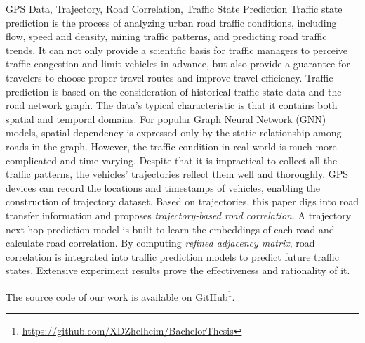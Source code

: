 
\begin{英文摘要}{GPS Data, Trajectory, Road Correlation, Traffic State Prediction}
  Traffic state prediction is the process of analyzing urban road traffic conditions, including flow, speed and density, mining traffic patterns, and predicting road traffic trends. It can not only provide a scientific basis for traffic managers to perceive traffic congestion and limit vehicles in advance, but also provide a guarantee for travelers to choose proper travel routes and improve travel efficiency. Traffic prediction is based on the consideration of historical traffic state data and the road network graph. The data's typical characteristic is that it contains both spatial and temporal domains. For popular Graph Neural Network (GNN) models, spatial dependency is expressed only by the static relationship among roads in the graph. However, the traffic condition in real world is much more complicated and time-varying. Despite that it is impractical to collect all the traffic patterns, the vehicles' trajectories reflect them well and thoroughly. GPS devices can record the locations and timestamps of vehicles, enabling the construction of trajectory dataset. Based on trajectories, this paper digs into road transfer information and proposes \textit{trajectory-based road correlation}. A trajectory next-hop prediction model is built to learn the embeddings of each road and calculate road correlation. By computing \textit{refined adjacency matrix}, road correlation is integrated into traffic prediction models to predict future traffic states. Extensive experiment results prove the effectiveness and rationality of it.

  The source code of our work is available on GitHub\footnote{\href{https://github.com/XDZhelheim/BachelorThesis}{https://github.com/XDZhelheim/BachelorThesis}}.
\end{英文摘要}

